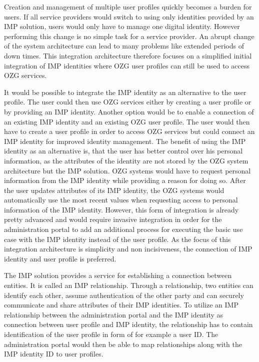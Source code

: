 \documentclass[
     12pt,         %
     a4paper,      %
     BCOR=10mm,version=first,     %
     DIV=14,version=first,        %
     ]{scrreprt}
\begin{document}
Creation and management of multiple user profiles quickly becomes a burden for users. If all service providers would switch to using only identities provided by an IMP solution, users would only have to manage one digital identity. However performing this change is no simple task for a service provider. An abrupt change of the system architecture can lead to many problems like extended periods of down times. This integration architecture therefore focuses on a simplified initial integration of IMP identities where OZG user profiles can still be used to access OZG services.

It would be possible to integrate the IMP identity as an alternative to the user profile. The user could then use OZG services either by creating a user profile or by providing an IMP identity. Another option would be to enable a connection of an existing IMP identity and an existing OZG user profile. The user would then have to create a user profile in order to access OZG services but could connect an IMP identity for improved identity management. The benefit of using the IMP identity as an alternative is, that the user has better control over his personal information, as the attributes of the identity are not stored by the OZG system architecture but the IMP solution. OZG systems would have to request personal information from the IMP identity while providing a reason for doing so. After the user updates attributes of its IMP identity, the OZG systems would automatically use the most recent values when requesting access to personal information of the IMP identity. However, this form of integration is already pretty advanced and would require invasive integration in order for the administration portal to add an additional process for executing the basic use case with the IMP identity instead of the user profile. As the focus of this integration architecture is simplicity and non incisiveness, the connection of IMP identity and user profile is preferred.

The IMP solution provides a service for establishing a connection between entities. It is called an IMP relationship. Through a relationship, two entities can identify each other, assume authentication of the other party and can securely communicate and share attributes of their IMP identities. To utilize an IMP relationship between the administration portal and the IMP identity as connection between user profile and IMP identity, the relationship has to contain identification of the user profile in form of for example a user ID. The administration portal would then be able to map relationships along with the IMP identity ID to user profiles.
\end{document}
